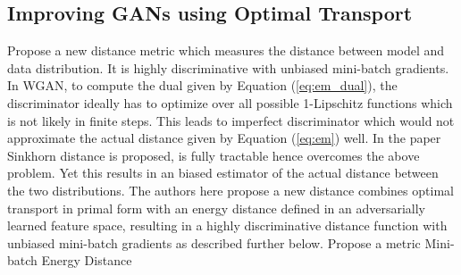 \subsection*{Improving GANs using Optimal Transport \citep{ot}}
Propose a new distance metric which measures the distance between model and data distribution. It is highly discriminative with unbiased mini-batch gradients. In WGAN, to compute the dual given by Equation (\ref{eq:em_dual}), the discriminator ideally has to optimize over all possible 1-Lipschitz functions which is not likely in finite steps. This leads to imperfect discriminator which would not approximate the actual distance given by Equation (\ref{eq:em}) well. In the paper \citep{sinkhorn} Sinkhorn distance is proposed, is fully tractable hence overcomes the above problem. Yet this results in an biased estimator of the actual distance between the two distributions. The authors here propose a new distance combines optimal transport in primal form with an energy distance defined in an adversarially learned feature space, resulting in a highly discriminative distance function with unbiased mini-batch gradients as described further below.
Propose a metric Mini-batch Energy Distance
